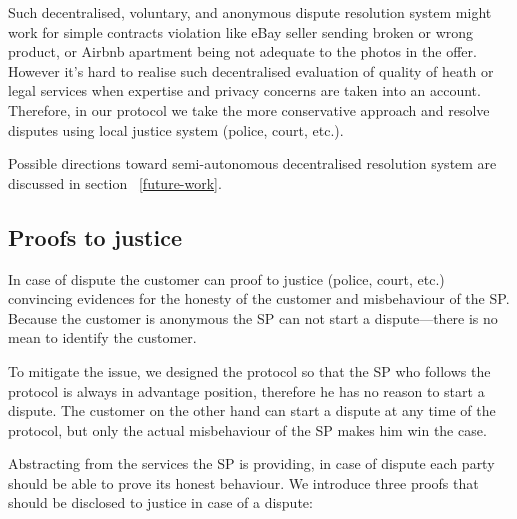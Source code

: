 \documentclass{ieeeaccess}
\begin{document}
Such decentralised, voluntary, and anonymous dispute resolution system
might work for simple contracts violation like eBay seller sending
broken or wrong product, or Airbnb apartment being not adequate to the
photos in the offer. However it's hard to realise such decentralised
evaluation of quality of heath or legal services when expertise and
privacy concerns are taken into an account. Therefore, in our protocol
we take the more conservative approach and resolve disputes using local
justice system (police, court, etc.).

Possible directions toward semi-autonomous decentralised resolution
system are discussed in section ~\ref{future-work}.


\subsection{Proofs to justice}\label{proof-of-justice}

In case of dispute the customer can proof to justice (police, court, etc.) convincing evidences for the honesty of the customer and misbehaviour of the SP. 
Because the customer is anonymous the SP can not start a dispute---there is no mean to identify the customer.

To mitigate the issue, we designed the protocol so that the SP who follows the protocol is always in advantage position, therefore he has no reason to start a dispute. The customer on the other hand can start a dispute at any time of the protocol, but only the actual misbehaviour of the SP makes him win the case.



Abstracting from the services the SP is providing, in case of dispute each party should be able to prove its honest behaviour. We introduce three proofs that should be disclosed to justice in case of a dispute:
\end{document}
